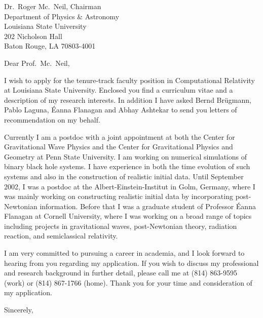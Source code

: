 \documentclass[11pt]{letter}
\begin{document}
\begin{letter}{Dr.\ Roger Mc.\ Neil, Chairman \\
Department of Physics \& Astronomy \\
Louisiana State University \\
202 Nicholson Hall \\
Baton Rouge, LA 70803-4001}


\opening{Dear Prof.\ Mc.\ Neil,}

I wish to apply for the tenure-track faculty position in Computational
Relativity at Louisiana State University. Enclosed you find a curriculum
vitae and a description of my research interests. In addition I have asked
Bernd Br\"ugmann, Pablo Laguna, \'Eanna Flanagan and Abhay Ashtekar to send
you letters of recommendation on my behalf.

Currently I am a postdoc with a joint appointment at both the Center for
Gravitational Wave Physics and the Center for Gravitational Physics and
Geometry at Penn State University. I am working on numerical simulations of
binary black hole systems. I have experience in both the time evolution of
such systems and also in the construction of realistic initial data. Until
September 2002, I was a postdoc at the Albert-Einstein-Institut in Golm,
Germany, where I was mainly working on constructing realistic initial data
by incorporating post-Newtonian information. Before that I was a graduate
student of Professor \'Eanna Flanagan at Cornell University, where I was
working on a broad range of topics including projects in gravitational waves,
post-Newtonian theory, radiation reaction, and semiclassical relativity.

I am very committed to pursuing a career in academia, and I look forward to
hearing from you regarding my application. 
If you wish to discuss my professional and research background
in further detail, please call me at (814) 863-9595 (work) or 
(814) 867-1766 (home).
Thank you for your time and consideration of my application.

\closing{Sincerely,}

\bigskip



\end{letter}
\end{document}
